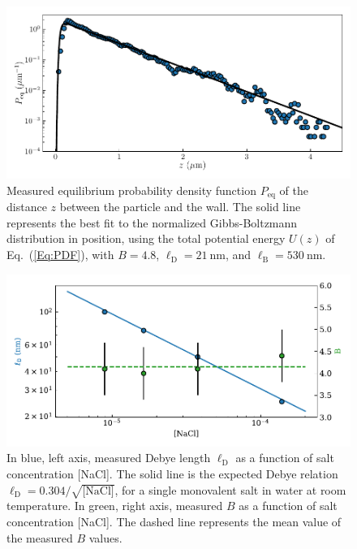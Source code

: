 \begin{figure}[h!]
	\centering
	\includegraphics{02_body/chapter3/images/trajctory_analysis/pdf_exp.pdf}
	\caption{Measured equilibrium probability density function $P_{\textrm{eq}}$ of the distance $z$ between the particle and the wall. The solid line represents the best fit to the normalized Gibbs-Boltzmann distribution in position, using the total potential energy $U(z)$ of Eq.~(\ref{Eq:PDF}), with $B = 4.8$, $\ell_\mathrm{D} = 21 ~ \mathrm{nm}$, and $\ell_\mathrm{B} = 530~ \mathrm{nm}$.~\href{https://github.com/eXpensia/Confined-Brownian-Motion/blob/main/02_body/chapter3/images/trajctory_analysis/graph_ploting.ipynb}{\faGithub}}
	\label{fig.pdf_exp}
\end{figure}


\begin{figure}[H]
	\centering
	\includegraphics{02_body/chapter3/images/trajctory_analysis/ld.pdf}
	\caption{In blue, left axis, measured Debye length $\ell_\mathrm{D}$ as a function of salt concentration [NaCl]. The solid line is the expected Debye relation $\ell_\mathrm{D}=0.304/\sqrt{\textrm{[NaCl]}}$, for a single monovalent salt in water at room temperature. In green, right axis, measured $B$ as a function of salt  concentration [NaCl]. The dashed line represents the mean value of the measured $B$ values.~\href{https://github.com/eXpensia/Confined-Brownian-Motion/blob/main/02_body/chapter3/images/trajctory_analysis/resume_ld_measures.ipynb}{\faGithub}}
	\label{fig.ld}
\end{figure}


